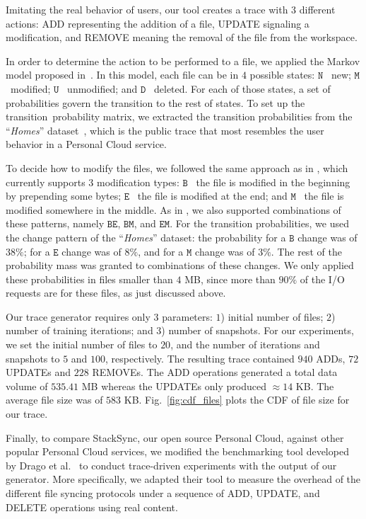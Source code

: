 Imitating the real behavior of users, our tool creates a trace with $3$ different actions: ADD representing the addition
of a file, UPDATE signaling a modification, and REMOVE meaning the removal of the file from the workspace.

In order to determine the action to be performed to a file, we applied the Markov model proposed in~\cite{Tarasov12}. 
In this model, each file can be in $4$ possible states: $\mathtt{N}$ \textemdash~new; $\mathtt{M} $\textemdash~modified; 
$\mathtt{U}$ \textemdash~unmodified; and $\mathtt{D}$ \textemdash~deleted.
For each of those states, a set of probabilities govern the transition to the rest of states.
To set up the transition~probability
matrix, we extracted the transition probabilities from the ``\textit{Homes}'' dataset~\cite{Tarasov12}, 
which is the public trace that most resembles the user behavior in a Personal Cloud service.

To decide how to modify the files, we followed the same approach as in \cite{Tarasov12},
which currently supports $3$ modification types: $\mathtt{B}$ \textemdash~the file is modified in the
beginning by prepending some bytes; $\mathtt{E}$ \textemdash~the file is modified at the end; and $\mathtt{M}$ \textemdash~the
file is modified somewhere in the middle.  As in \cite{Tarasov12}, we also supported
combinations of these patterns, namely $\mathtt{BE}$, $\mathtt{BM}$, and $\mathtt{EM}$. For the transition 
probabilities, we used the change pattern of the ``\textit{Homes}'' dataset: the probability for a $\mathtt{B}$ 
change was of $38\%$; for a $\mathtt{E}$ change was of $8\%$, and for a $\mathtt{M}$ change was of $3\%$. 
The rest of the probability mass was granted to combinations of these changes. We only applied these probabilities
in files smaller than $4$ MB, since more than $90\%$ of the I/O requests are for these files, as just
discussed above.

Our trace generator requires only $3$ parameters: $1$) initial number of files; $2$) number
of training iterations; and $3$) number of snapshots. For our experiments, we set the
initial number of files to $20$, and the number of iterations and snapshots to $5$ and
$100$, respectively. The resulting trace contained $940$ ADDs, $72$ UPDATEs and $228$ REMOVEs.
The ADD operations generated a total data volume of $535.41$ MB whereas the UPDATEs only produced
$\approx 14$ KB. The average file size was of $583$ KB. Fig.~\ref{fig:cdf_files} plots
the CDF of file size for our trace.

Finally, to compare StackSync, our open source Personal Cloud, against other popular Personal Cloud services,
we modified the benchmarking tool developed by Drago et al.~\cite{drago2013benchmarking} to
conduct trace-driven experiments with the output of our generator. More specifically, we adapted
their tool to measure the overhead of the different file syncing protocols under a sequence of
ADD, UPDATE, and DELETE operations using real content.

